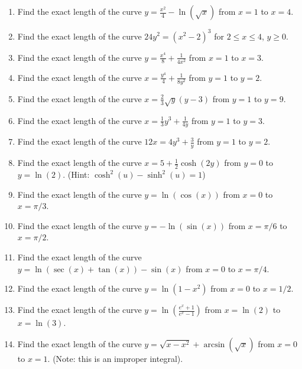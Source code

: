 \documentclass[12pt]{article}
\begin{document}
\begin{enumerate}
    \item Find the exact length of the curve $y = \frac{x^2}{4} - \ln(\sqrt{x})$ from $x=1$ to $x=4$.
    
    \item Find the exact length of the curve $24y^2 = (x^2-2)^3$ for $2 \le x \le 4$, $y \ge 0$.
    
    \item Find the exact length of the curve $y = \frac{x^4}{8} + \frac{1}{4x^2}$ from $x=1$ to $x=3$.
    
    \item Find the exact length of the curve $x = \frac{y^4}{4} + \frac{1}{8y^2}$ from $y=1$ to $y=2$.
    
    \item Find the exact length of the curve $x = \frac{2}{3}\sqrt{y}(y-3)$ from $y=1$ to $y=9$.
    
    \item Find the exact length of the curve $x = \frac{1}{3}y^3 + \frac{1}{4y}$ from $y=1$ to $y=3$.
    
    \item Find the exact length of the curve $12x = 4y^3 + \frac{3}{y}$ from $y=1$ to $y=2$.
    
    \item Find the exact length of the curve $x=5+\frac{1}{2}\cosh(2y)$ from $y=0$ to $y=\ln(2)$. (Hint: $\cosh^2(u) - \sinh^2(u)=1$)
    
    \item Find the exact length of the curve $y = \ln(\cos(x))$ from $x=0$ to $x=\pi/3$.
    
    \item Find the exact length of the curve $y = -\ln(\sin(x))$ from $x=\pi/6$ to $x=\pi/2$.
    
    \item Find the exact length of the curve $y = \ln(\sec(x) + \tan(x)) - \sin(x)$ from $x=0$ to $x=\pi/4$.
    
    \item Find the exact length of the curve $y = \ln(1-x^2)$ from $x=0$ to $x=1/2$.
    
    \item Find the exact length of the curve $y = \ln(\frac{e^x+1}{e^x-1})$ from $x=\ln(2)$ to $x=\ln(3)$.
    
    \item Find the exact length of the curve $y = \sqrt{x-x^2} + \arcsin(\sqrt{x})$ from $x=0$ to $x=1$. (Note: this is an improper integral).
    

\end{enumerate}
\end{document}
